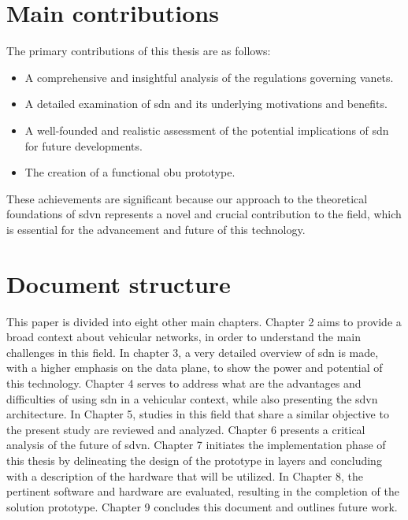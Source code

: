 
\section{Main contributions} %
\label{sec:main_contributions}

The primary contributions of this thesis are as follows:
\begin{itemize}
    \item A comprehensive and insightful analysis of the regulations governing \glspl{vanet}.
    \item A detailed examination of \gls{sdn} and its underlying motivations and benefits.
    \item A well-founded and realistic assessment of the potential implications of \gls{sdn} for future developments.
    \item The creation of a functional \gls{obu} prototype.
\end{itemize}
These achievements are significant because our approach to the theoretical foundations of \gls{sdvn} represents a novel and crucial contribution to the field, which is essential for the advancement and future of this technology.


\section{Document structure} %
\label{sec:document_structure}

This paper is divided into eight other main chapters. Chapter 2 aims to provide a broad context about vehicular networks, in order to understand the main challenges in this field. In chapter 3, a very detailed overview of \gls{sdn} is made, with a higher emphasis on the data plane, to show the power and potential of this technology. Chapter 4 serves to address what are the advantages and difficulties of using \gls{sdn} in a vehicular context, while also presenting the \gls{sdvn} architecture. In Chapter 5, studies in this field that share a similar objective to the present study are reviewed and analyzed. Chapter 6 presents a critical analysis of the future of \gls{sdvn}. Chapter 7 initiates the implementation phase of this thesis by delineating the design of the prototype in layers and concluding with a description of the hardware that will be utilized. In Chapter 8, the pertinent software and hardware are evaluated, resulting in the completion of the solution prototype. Chapter 9 concludes this document and outlines future work.



